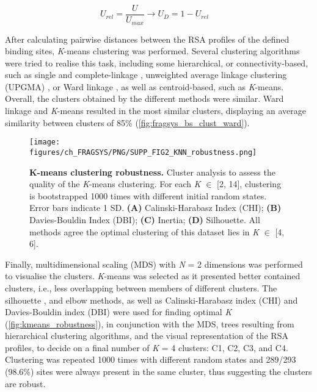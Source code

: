 \begin{equation}
U_{rel} = \frac{U}{U_{max}} \rightarrow U_D = 1 - U_{rel} \quad 
\label{eq:relative_U}
\end{equation}

\vspace{-12pt} %

After calculating pairwise distances between the RSA profiles of the defined binding sites, \textit{K}-means clustering \cite{LLOYD_1982_KMEANS} was performed. Several clustering algorithms were tried to realise this task, including some hierarchical, or connectivity-based, such as single and complete-linkage \cite{SORENSEN_1948_CL}, unweighted average linkage clustering (UPGMA) \cite{SOKAL_1958_UPGMA}, or Ward linkage \cite{WARD_1963_CLUSTERING}, as well as centroid-based, such as \textit{K}-means. Overall, the clusters obtained by the different methods were similar. Ward linkage and \textit{K}-means resulted in the most similar clusters, displaying an average similarity between clusters of 85\% (\autoref{fig:fragsys_bs_clust_ward}).

\begin{figure}[ht!]
    \centering
    \texttt{[image: figures/ch\_FRAGSYS/PNG/SUPP\_FIG2\_KNN\_robustness.png]}
    \caption[\textit{K}-means clustering robustness]{\textbf{K-means clustering robustness.} Cluster analysis to assess the quality of the \textit{K}-means clustering. For each \textit{K} $\in$ [2, 14], clustering is bootstrapped 1000 times with different initial random states. Error bars indicate 1 SD. \textbf{(A)} Calinski-Harabasz Index (CHI); \textbf{(B)} Davies-Bouldin Index (DBI); \textbf{(C)} Inertia; \textbf{(D)} Silhouette. All methods agree the optimal clustering of this dataset lies in \textit{K} $\in$ [4, 6].}
    \label{fig:kmeans_robustness}
\end{figure}

Finally, multidimensional scaling (MDS) \cite{MEAD_1992_MDS} with \textit{N} = 2 dimensions was performed to visualise the clusters. \textit{K}-means was selected as it presented better contained clusters, i.e., less overlapping between members of different clusters. The silhouette \cite{ROUSSEEUW_1987_SILHOUETTES}, and elbow \cite{THORNDIKE_1953_ELBOW} methods, as well as Calinski-Harabasz index (CHI) \cite{CALINSKI_1974_CHI} and Davies-Bouldin index (DBI) \cite{DAVIES_1979_DBI} were used for finding optimal \textit{K} (\autoref{fig:kmeans_robustness}), in conjunction with the MDS, trees resulting from hierarchical clustering algorithms, and the visual representation of the RSA profiles, to decide on a final number of \textit{K} = 4 clusters: C1, C2, C3, and C4. Clustering was repeated 1000 times with different random states and 289/293 (98.6\%) sites were always present in the same cluster, thus suggesting the clusters are robust.

